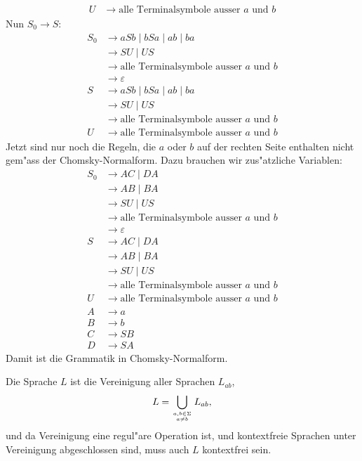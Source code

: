 \begin{loesung}
\begin{teilaufgaben}
\begin{align*}
U  &\rightarrow \text{alle Terminalsymbole ausser $a$ und $b$}
\end{align*}
Nun $S_0\rightarrow S$:
\begin{align*}
S_0&\rightarrow aSb\;|\; bSa\;|\;ab\;|\;ba\\
   &\rightarrow SU \;|\; US\\
   &\rightarrow \text{alle Terminalsymbole ausser $a$ und $b$}\\
   &\rightarrow \varepsilon\\
S  &\rightarrow aSb\;|\; bSa\;|\;ab\;|\;ba\\
   &\rightarrow SU \;|\; US\\
   &\rightarrow \text{alle Terminalsymbole ausser $a$ und $b$}\\
U  &\rightarrow \text{alle Terminalsymbole ausser $a$ und $b$}
\end{align*}
Jetzt sind nur noch die Regeln, die $a$ oder $b$ auf der rechten
Seite enthalten nicht gem"ass der Chomsky-Normalform.
Dazu brauchen wir zus"atzliche Variablen:
\begin{align*}
S_0&\rightarrow AC\;|\; DA \\
   &\rightarrow AB\;|\;BA\\
   &\rightarrow SU \;|\; US\\
   &\rightarrow \text{alle Terminalsymbole ausser $a$ und $b$}\\
   &\rightarrow \varepsilon\\
S  &\rightarrow AC\;|\; DA \\
   &\rightarrow AB\;|\;BA\\
   &\rightarrow SU \;|\; US\\
   &\rightarrow \text{alle Terminalsymbole ausser $a$ und $b$}\\
U  &\rightarrow \text{alle Terminalsymbole ausser $a$ und $b$}\\
A  &\rightarrow a \\
B  &\rightarrow b \\
C  &\rightarrow SB \\
D  &\rightarrow SA
\end{align*}
Damit ist die Grammatik in Chomsky-Normalform.
\item
Die Sprache $L$ ist die Vereinigung aller Sprachen $L_{ab}$,
\[
L=\bigcup_{a,b\in\Sigma\atop a\ne b}L_{ab},
\]
und da Vereinigung eine regul"are Operation ist, und kontextfreie Sprachen
unter Vereinigung abgeschlossen sind, muss auch $L$ kontextfrei sein.
\qedhere
\end{teilaufgaben}
\end{loesung}

